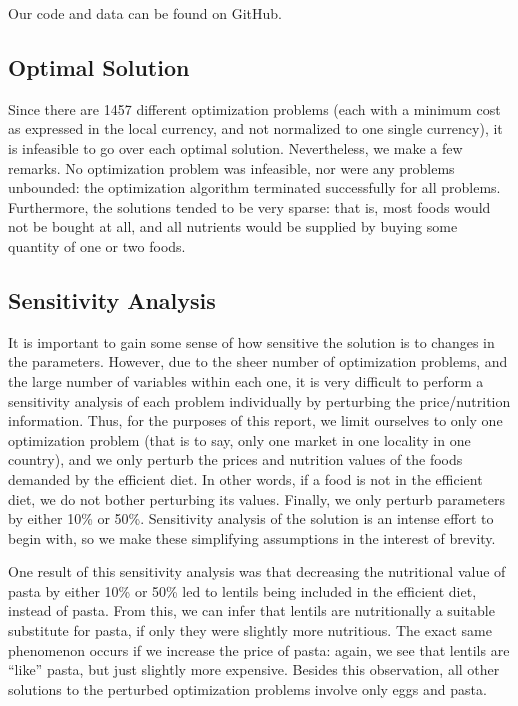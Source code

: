 Our code and data can be found on GitHub.\cite{eigenfoo}

\subsection{Optimal Solution}
Since there are 1457 different optimization problems (each with a minimum cost as expressed in the local currency, and not normalized to one single currency), it is infeasible to go over each optimal solution. Nevertheless, we make a few remarks. No optimization problem was infeasible, nor were any problems unbounded: the optimization algorithm terminated successfully for all problems. Furthermore, the solutions tended to be very sparse: that is, most foods would not be bought at all, and all nutrients would be supplied by buying some quantity of one or two foods.

\subsection{Sensitivity Analysis}
It is important to gain some sense of how sensitive the solution is to changes in the parameters. However, due to the sheer number of optimization problems, and the large number of variables within each one, it is very difficult to perform a sensitivity analysis of each problem individually by perturbing the price/nutrition information. Thus, for the purposes of this report, we limit ourselves to only one optimization problem (that is to say, only one market in one locality in one country), and we only perturb the prices and nutrition values of the foods demanded by the efficient diet. In other words, if a food is not in the efficient diet, we do not bother perturbing its values. Finally, we only perturb parameters by either 10\% or 50\%. Sensitivity analysis of the solution is an intense effort to begin with, so we make these simplifying assumptions in the interest of brevity.

One result of this sensitivity analysis was that decreasing the nutritional value of pasta by either 10\% or 50\% led to lentils being included in the efficient diet, instead of pasta. From this, we can infer that lentils are nutritionally a suitable substitute for pasta, if only they were slightly more nutritious. The exact same phenomenon occurs if we increase the price of pasta: again, we see that lentils are ``like'' pasta, but just slightly more expensive. Besides this observation, all other solutions to the perturbed optimization problems involve only eggs and pasta.

